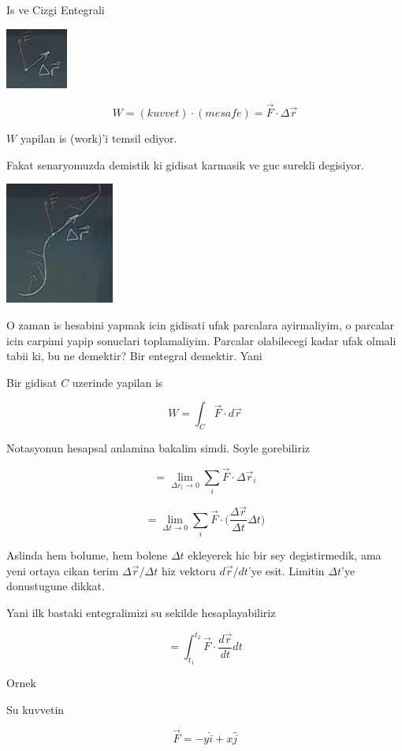 \documentclass[12pt,fleqn]{article}
\begin{document}
Is ve Cizgi Entegrali

\includegraphics[height=2cm]{19_8.png}

\[ W = (kuvvet)\cdot(mesafe) = \vec{F}\cdot\Delta\vec{r} \]

$W$ yapilan is (work)'i temsil ediyor. 

Fakat senaryomuzda demistik ki gidisat karmasik ve guc surekli
degisiyor.

\includegraphics[height=4cm]{19_9.png}

O zaman is hesabini yapmak icin gidisati ufak parcalara ayirmaliyim, o
parcalar icin carpimi yapip sonuclari toplamaliyim. Parcalar olabilecegi
kadar ufak olmali tabii ki, bu ne demektir? Bir entegral demektir. Yani

Bir gidisat $C$ uzerinde yapilan is 

\[ W = \int_C \vec{F} \cdot d\vec{r} \]

Notasyonun hesapsal anlamina bakalim simdi. Soyle gorebiliriz

\[ = \lim_{\Delta r_i \to 0} \sum_i  \vec{F} \cdot \Delta\vec{r}_i\]

\[ = 
\lim_{\Delta t \to 0} \sum_i  
\vec{F} \cdot \bigg( \frac{\Delta\vec{r}}{\Delta t} \Delta t 
\bigg)
\]

Aslinda hem bolume, hem bolene $\Delta t$ ekleyerek hic bir sey
degistirmedik, ama yeni ortaya cikan terim $\Delta\vec{r} / \Delta t$ hiz
vektoru $d\vec{r}/dt$'ye esit. Limitin $\Delta t$'ye donustugune dikkat.

Yani ilk bastaki entegralimizi su sekilde hesaplayabiliriz

\[ = \int_{t_1}^{t_2} \vec{F} \cdot \frac{d\vec{r}}{dt} dt \]

Ornek

Su kuvvetin

\[ \vec{F} = -y\hat{i} + x\hat{j} \]
\end{document}
